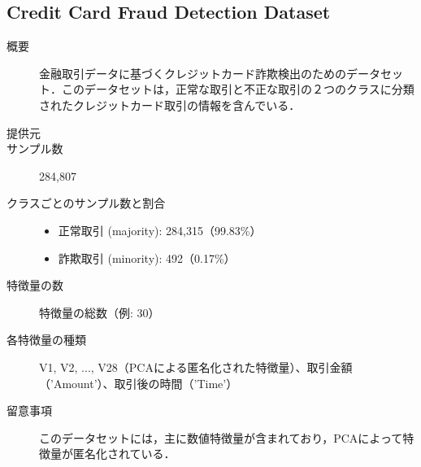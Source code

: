 \subsection{Credit Card Fraud Detection Dataset}
\begin{description}
    \item[概要] 金融取引データに基づくクレジットカード詐欺検出のためのデータセット．このデータセットは，正常な取引と不正な取引の２つのクラスに分類されたクレジットカード取引の情報を含んでいる．
    \item[提供元] 
    \item[サンプル数] 284,807
    \item[クラスごとのサンプル数と割合] \mbox{}
        \begin{itemize}
            \item 正常取引 (majority): 284,315（99.83\%）
            \item 詐欺取引 (minority): 492（0.17\%）
        \end{itemize}
    \item[特徴量の数] 特徴量の総数（例: 30）
    \item[各特徴量の種類] \mbox{}
            V1, V2, ..., V28（PCAによる匿名化された特徴量）、取引金額（'Amount'）、取引後の時間（'Time'）
    \item[留意事項] このデータセットには，主に数値特徴量が含まれており，PCAによって特徴量が匿名化されている．
\end{description}

